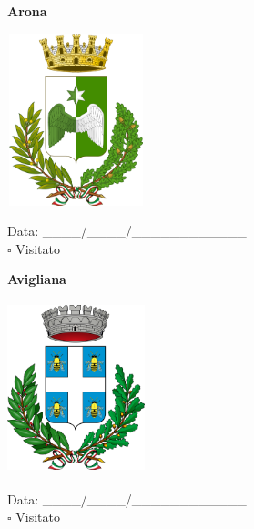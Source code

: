 \documentclass[a5paper,12pt]{article}
\begin{document}
\noindent
\begin{minipage}[t]{0.45\textwidth}
    \begin{center}
        \textbf{Arona}
    \end{center}
    \vspace{-0.5cm} %
    \begin{center}
        \includegraphics[height= 5cm, width=4cm]{Piemonte/Stemma Arona.png}
    \end{center}
    \vspace{-0.4cm} %
    \begin{flushleft}
        Data: \_\_\_\_/\_\_\_\_/\_\_\_\_\_\_\_\_\_\_\_\_ \\
        $\square$ Visitato
    \end{flushleft}
\end{minipage}
\hfill
\noindent
\begin{minipage}[t]{0.45\textwidth}
    \begin{center}
        \textbf{Avigliana}
    \end{center}
    \vspace{-0.5cm} %
    \begin{center}
        \includegraphics[height= 5cm, width=4cm]{Piemonte/Stemma Avigliana.png}
    \end{center}
    \vspace{-0.4cm} %
    \begin{flushleft}
        Data: \_\_\_\_/\_\_\_\_/\_\_\_\_\_\_\_\_\_\_\_\_ \\
        $\square$ Visitato
    \end{flushleft}
\end{minipage}
\end{document}
